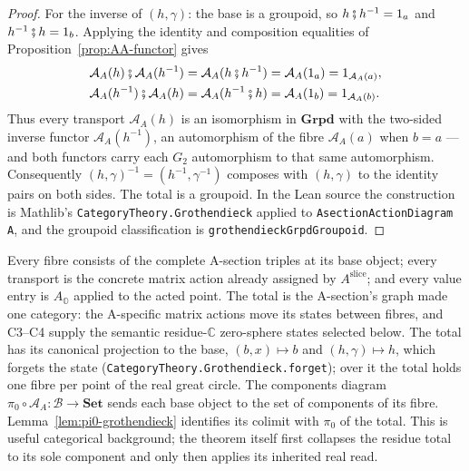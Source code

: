 \documentclass[11pt]{article}
\newcommand{\OO}{\mathbb{O}}
\newcommand{\CC}{\mathbb{C}}
\theoremstyle{plain}
\theoremstyle{definition}
\theoremstyle{remark}
\begin{document}
\begin{proof}
For the inverse of $(h,\gamma)$: the base is a groupoid, so
$h\fatsemi h^{-1}=1_a$ and $h^{-1}\fatsemi h=1_b$.  Applying the identity
and composition equalities of Proposition~\ref{prop:AA-functor} gives
\[
\begin{aligned}
 \mathcal A_A(h)\fatsemi\mathcal A_A(h^{-1})
   &=\mathcal A_A(h\fatsemi h^{-1})
    =\mathcal A_A(1_a)=1_{\mathcal A_A(a)},\\
 \mathcal A_A(h^{-1})\fatsemi\mathcal A_A(h)
   &=\mathcal A_A(h^{-1}\fatsemi h)
    =\mathcal A_A(1_b)=1_{\mathcal A_A(b)}.
\end{aligned}
\]
Thus every transport $\mathcal A_A(h)$ is an isomorphism in
$\mathbf{Grpd}$ with the two-sided inverse functor
$\mathcal A_A(h^{-1})$, an
automorphism of the fibre $\mathcal A_A(a)$ when $b=a$ --- and
both functors carry each $G_2$ automorphism to that same automorphism.  Consequently
$(h,\gamma)^{-1}=(h^{-1},\gamma^{-1})$ composes with $(h,\gamma)$ to the
identity pairs on both sides. The total is a groupoid. In the Lean
source the construction is Mathlib's
\texttt{CategoryTheory.Grothendieck} applied to
\texttt{AsectionActionDiagram\,A}, and the groupoid classification is
\texttt{grothendieckGrpdGroupoid}.
\end{proof}

Every fibre consists of the complete A-section triples at its base object;
every transport is the concrete matrix action already assigned by
$A^{\mathrm{slice}}$; and every value entry is $A_{\OO}$ applied to the
acted point. The total is the A-section's graph made one category: the
A-specific matrix actions move its states between fibres, and
\textup{C3--C4} supply the semantic residue-$\CC$ zero-sphere states
selected below. The total has its canonical projection to the base,
$(b,x)\mapsto b$ and $(h,\gamma)\mapsto h$, which forgets the state
\textup{(}\texttt{CategoryTheory.Grothendieck.forget}\textup{)}; over it
the total holds one fibre per point of the real great circle. The components diagram
$\pi_0\circ\mathcal A_A:\mathcal B\to\mathbf{Set}$ sends each base object to
the set of components of its fibre. Lemma~\ref{lem:pi0-grothendieck}
identifies its colimit with $\pi_0$ of the total. This is useful categorical
background; the theorem itself first collapses the residue total to its sole
component and only then applies its inherited real read.
\end{document}
